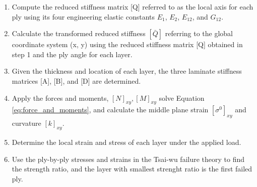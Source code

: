 \begin{enumerate}
\item Compute the reduced stiffness matrix [Q] referred to as the local axis for each ply using its
	four engineering elastic constants $E_1 $, $E_2 $, $E_{12} $, and $G_{12} $.

\item Calculate the transformed reduced stiffness $[\bar{Q}] $ referring to the global coordinate
	system (x, y) using the reduced stiffness matrix [Q] obtained in step 1 and the ply angle for
	each layer.

\item  Given the thickness and location of each layer, the three laminate stiffness matrices [A],
	[B], and [D] are determined.

\item  Apply the forces and moments, $[N]_{xy}, [M]_{xy} $ solve Equation
	\ref{eq:force_and_moments}, and calculate the middle plane strain $[\sigma ^{0}]_{xy} $ and
	curvature $[k]_{xy} $.

\item Determine the local strain and stress of each layer under the applied load.

\item  Use the ply-by-ply stresses and strains in the Tsai-wu failure theory to find the strength
	ratio, and the layer with smallest strenght ratio is the first failed ply. 
\end{enumerate}

